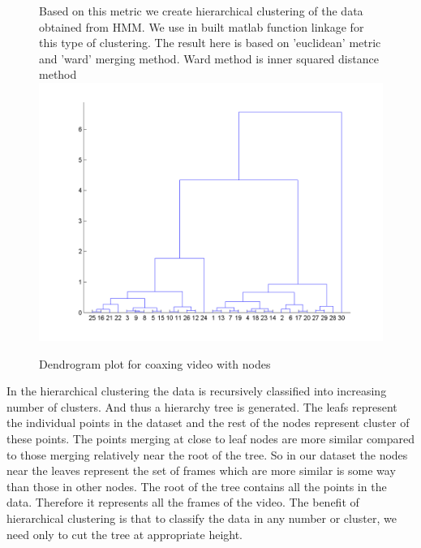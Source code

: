 \documentclass[10pt, twocolumn]{article}
\begin{document}
\begin{figure}[H]
\centering
Based on this metric we create hierarchical clustering of the data obtained from HMM. We use in built matlab function linkage for this type of clustering. The result here is based on 'euclidean' metric and 'ward' merging method. Ward method is inner squared distance method\\
\centering
\includegraphics[scale=0.3]{dendoCoax.png}
\caption{Dendrogram plot for coaxing video with  nodes}
\end{figure}

In the hierarchical clustering the data is recursively classified into increasing number of clusters. And thus a hierarchy tree is generated. The leafs represent the individual points in the dataset and the rest of the nodes represent cluster of these points.  The points merging at close to leaf nodes are more similar compared to those merging relatively near the root of the tree. So in our dataset the nodes near the leaves represent the set of frames which are more similar is some way than those in other nodes.
The root of the tree contains all the points in the data. Therefore it represents all the frames of the video. The benefit of hierarchical clustering is that to classify the data in any number or cluster, we need only to cut the tree at appropriate height.\\
\end{document}
